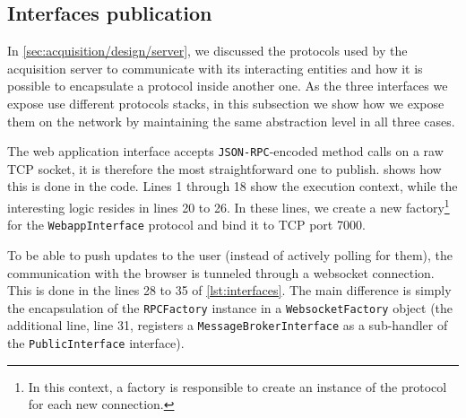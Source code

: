 \subsection{Interfaces publication}

In \vref{sec:acquisition/design/server}, we discussed the protocols used by the acquisition server to communicate with its interacting entities and how it is possible to encapsulate a protocol inside another one. As the three interfaces we expose use different protocols stacks, in this subsection we show how we expose them on the network by maintaining the same abstraction level in all three cases.

The web application interface accepts \texttt{JSON-RPC}-encoded method calls on a raw TCP socket, it is therefore the most straightforward one to publish.  shows how this is done in the code. Lines 1 through 18 show the execution context, while the interesting logic resides in lines 20 to 26. In these lines, we create a new factory\footnote{In this context, a factory is responsible to create an instance of the protocol for each new connection.} for the \texttt{WebappInterface} protocol and bind it to TCP port 7000.

To be able to push updates to the user (instead of actively polling for them), the communication with the browser is tunneled through a websocket connection. This is done in the lines 28 to 35 of \vref{lst:interfaces}. The main difference is simply the encapsulation of the \texttt{RPCFactory} instance in a \texttt{WebsocketFactory} object (the additional line, line 31, registers a \texttt{MessageBrokerInterface} as a sub-handler of the \texttt{PublicInterface} interface).

